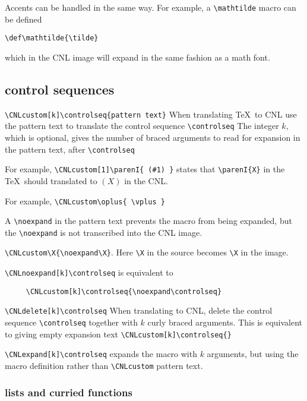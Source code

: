 \documentclass[12pt]{amsart}
\begin{document}
Accents can be handled in the same way.  For example, a \verb!\mathtilde! macro
can be defined 

\verb!\def\mathtilde{\tilde}!

which in the CNL image will expand in the same fashion as a math font.





\subsection{control sequences}

\verb!\CNLcustom[k]\controlseq{pattern text}!   When translating \TeX\ to CNL use the pattern text to translate the control sequence \verb!\controlseq!
The integer $k$, which is optional, gives the number of braced arguments to read for expansion in the pattern text, after \verb!\controlseq!

For example, 
\verb!\CNLcustom[1]\parenI{ (#1) }! states that \verb!\parenI{X}! in the \TeX\ should translated to $(X)$ in the CNL.

For example,
\verb!\CNLcustom\oplus{ \vplus }!

A \verb!\noexpand! in the pattern text prevents the macro from being expanded, but the \verb!\noexpand! is not transcribed into the CNL image.

\verb!\CNLcustom\X{\noexpand\X}!.  Here \verb!\X! in the source becomes \verb!\X! in the image.

\verb!\CNLnoexpand[k]\controlseq! is equivalent to 
\begin{Verbatim}
     \CNLcustom[k]\controlseq{\noexpand\controlseq}
\end{Verbatim}

\verb!\CNLdelete[k]\controlseq!  When translating to CNL, delete the control sequence \verb!\controlseq! together with $k$ curly braced arguments.
This is equivalent to giving empty expansion text \verb!\CNLcustom[k]\controlseq{}! 

\verb!\CNLexpand[k]\controlseq! expands the macro with $k$ arguments, but using the macro definition rather than \verb!\CNLcustom! pattern text.


\subsubsection{lists and curried functions}
\end{document}
